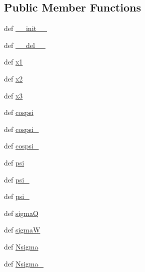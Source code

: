 \subsection*{Public Member Functions}
\begin{DoxyCompactItemize}
\item 
def \hyperlink{classamonpy_1_1anal_1_1cluster_1_1_fisher__tp_a0baaa3ae5832347d6c4effe3228d1070}{\-\_\-\-\_\-init\-\_\-\-\_\-}
\item 
def \hyperlink{classamonpy_1_1anal_1_1cluster_1_1_fisher__tp_ad550db1bd226069fb26449257c251213}{\-\_\-\-\_\-del\-\_\-\-\_\-}
\item 
def \hyperlink{classamonpy_1_1anal_1_1cluster_1_1_fisher__tp_a88759ac9f5b8f557a1fc65edda6b1865}{x1}
\item 
def \hyperlink{classamonpy_1_1anal_1_1cluster_1_1_fisher__tp_aede64eea0d9a6ea397fc9943442d9534}{x2}
\item 
def \hyperlink{classamonpy_1_1anal_1_1cluster_1_1_fisher__tp_a1429e25626d425974297039b56697d19}{x3}
\item 
def \hyperlink{classamonpy_1_1anal_1_1cluster_1_1_fisher__tp_a0c11d7d64547a5b4c531d192f71d37e3}{cospsi}
\item 
def \hyperlink{classamonpy_1_1anal_1_1cluster_1_1_fisher__tp_a689d0511cf0145cb3126ef3ea70583b2}{cospsi\-\_}
\item 
def \hyperlink{classamonpy_1_1anal_1_1cluster_1_1_fisher__tp_a3af3748863df70d1014ea9bab2e095b2}{cospsi\-\_}
\item 
def \hyperlink{classamonpy_1_1anal_1_1cluster_1_1_fisher__tp_a8f2e659c53f1d1615c2f10d3c8cd6fb3}{psi}
\item 
def \hyperlink{classamonpy_1_1anal_1_1cluster_1_1_fisher__tp_a450b172488a85a08c389a9d2451ed193}{psi\-\_}
\item 
def \hyperlink{classamonpy_1_1anal_1_1cluster_1_1_fisher__tp_a55ac28f856fc291a16f49d816003b773}{psi\-\_}
\item 
def \hyperlink{classamonpy_1_1anal_1_1cluster_1_1_fisher__tp_a51ee7891b489762cd04fdab179870082}{sigma\-Q}
\item 
def \hyperlink{classamonpy_1_1anal_1_1cluster_1_1_fisher__tp_a4c46321795fc93fee607a0cc4d515b7e}{sigma\-W}
\item 
def \hyperlink{classamonpy_1_1anal_1_1cluster_1_1_fisher__tp_a6153df9576e310a26a20e7614c8bccaf}{Nsigma}
\item 
def \hyperlink{classamonpy_1_1anal_1_1cluster_1_1_fisher__tp_adf7afbc7eb930de4db1b7cd182c9f7ec}{Nsigma\-\_}
\item 

\end{DoxyCompactItemize}
